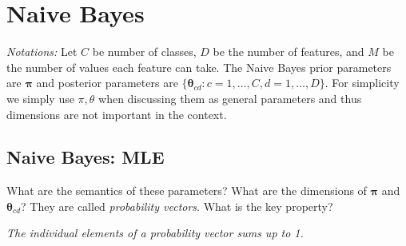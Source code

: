 \documentclass{discussion}
\begin{document}


   
\renewcommand{\R}{\mathbb{R}}
\renewcommand{\vec}[1]{\boldsymbol{#1}}
\newcommand{\Dtrain}{\mathcal{D}_{\mathrm{train}}}
\newcommand{\tm}{\mathbf{\theta}_{\text{model}}}
\newcommand{\xtest}{\mathbf{\x}_{\text{test}}}
\newcommand{\test}{\mathrm{test}}
\newcommand{\pred}{\mathrm{pred}}

\section{Naive Bayes}
\emph{Notations:} Let $C$ be number of classes, $D$ be the number of features, and $M$ be the number of values each feature can take. The Naive Bayes prior parameters are $\vec{\pi}$ and posterior parameters are $\{\vec{\theta}_{cd}: c=1,\ldots,C, d = 1,\ldots,D\}$. For simplicity we simply use $\pi, \theta$ when discussing them as general parameters and thus dimensions are not important in the context.
\subsection{Naive Bayes: MLE}


\begin{exercise}
 What are the semantics of these parameters? What are the dimensions of $\vec{\pi}$ and $\vec{\theta}_{cd}$? They are called \emph{probability vectors}. What is the key property?

 \textit{The individual elements of a probability vector sums up to 1.}
\end{exercise}
\end{document}
